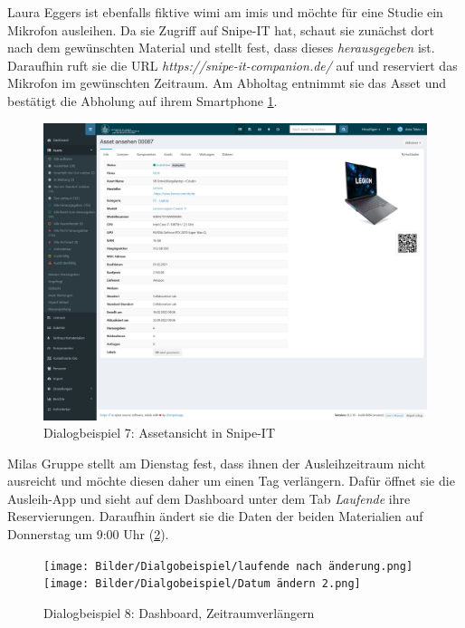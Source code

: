 \newpage
Laura Eggers ist ebenfalls fiktive \ac{wimi} am \ac{imis} und möchte für eine
Studie ein Mikrofon ausleihen. Da sie Zugriff auf Snipe-IT hat, schaut sie
zunächst dort nach dem gewünschten Material und stellt fest, dass dieses
\textit{herausgegeben} ist. Daraufhin ruft sie die URL
\textit{https://snipe-it-companion.de/} auf und reserviert das Mikrofon im
gewünschten Zeitraum. Am Abholtag entnimmt sie das Asset und bestätigt die
Abholung auf ihrem Smartphone \ref{fig:georg5}. 
\begin{figure}[h]
    \centering
    \includegraphics[scale=0.17]{Bilder/Screenshot 2022-10-14 at 11-26-25 Asset ansehen 00087 Ausleihmanagement.png}
    \caption{Dialogbeispiel 7: Assetansicht in Snipe-IT}\label{fig:georg5}
\end{figure}


Milas Gruppe stellt am Dienstag fest, dass ihnen der Ausleihzeitraum nicht
ausreicht und möchte diesen daher um einen Tag verlängern. Dafür öffnet sie die
Ausleih-App und sieht auf dem Dashboard unter dem Tab \textit{Laufende} ihre
Reservierungen. Daraufhin ändert sie die Daten der beiden Materialien auf
Donnerstag um 9:00 Uhr (\ref{fig:andern}).
\begin{figure}[h]
    \centering
    \texttt{[image: Bilder/Dialgobeispiel/laufende nach änderung.png]}\hspace{1em}
    \texttt{[image: Bilder/Dialgobeispiel/Datum ändern 2.png]}\hspace{1em}
    \caption{Dialogbeispiel 8: Dashboard, Zeitraumverlängern}\label{fig:andern}
\end{figure}


